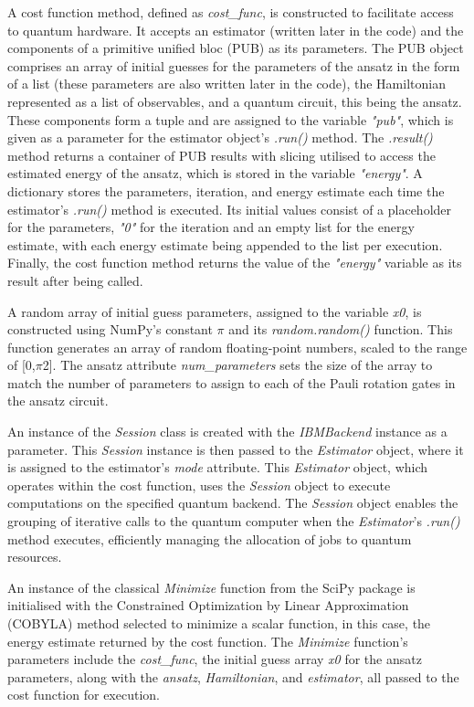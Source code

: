 \documentclass{article}
\begin{document}
A cost function method, defined as \textit{cost\_func}, is constructed to facilitate access to quantum hardware. It accepts an estimator (written later in the code) and the components of a primitive unified bloc (PUB) as its parameters. The PUB object comprises an array of initial guesses for the parameters of the ansatz in the form of a list (these parameters are also written later in the code), the Hamiltonian represented as a list of observables, and a quantum circuit, this being the ansatz. These components form a tuple and are assigned to the variable \textit{"pub"}, which is given as a parameter for the estimator object's \textit{.run()} method. The \textit{.result()} method returns a container of PUB results\cite{PrimitiveResult} with slicing utilised to access the estimated energy of the ansatz, which is stored in the variable \textit{"energy"}. A dictionary stores the parameters, iteration, and energy estimate each time the estimator's \textit{.run()} method is executed. Its initial values consist of a placeholder for the parameters, \textit{"0"} for the iteration and an empty list for the energy estimate, with each energy estimate being appended to the list per execution. Finally, the cost function method returns the value of the \textit{"energy"} variable as its result after being called.

A random array of initial guess parameters, assigned to the variable \textit{x0}, is constructed using NumPy’s constant $\pi$ and its \textit{random.random()} function. This function generates an array of random floating-point numbers, scaled to the range of [0,$\pi$2]. The ansatz attribute \textit{num\_parameters} sets the size of the array to match the number of parameters to assign to each of the Pauli rotation gates in the ansatz circuit.

An instance of the \textit{Session} class is created with the \textit{IBMBackend} instance as a parameter. This \textit{Session} instance is then passed to the \textit{Estimator} object, where it is assigned to the estimator's \textit{mode} attribute. This \textit{Estimator} object, which operates within the cost function, uses the \textit{Session} object to execute computations on the specified quantum backend. The \textit{Session} object enables the grouping of iterative calls to the quantum computer\cite{Session} when the \textit{Estimator}'s \textit{.run()} method executes, efficiently managing the allocation of jobs to quantum resources.

An instance of the classical \textit{Minimize} function from the SciPy package is initialised with the Constrained Optimization by Linear Approximation (COBYLA) method selected to minimize a scalar function, in this case, the energy estimate returned by the cost function.  The \textit{Minimize} function's parameters include the \textit{cost\_func}, the initial guess array \textit{x0} for the ansatz parameters, along with the \textit{ansatz}, \textit{Hamiltonian}, and \textit{estimator}, all passed to the cost function for execution. 
\end{document}
